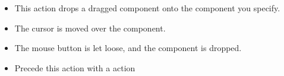 
\begin{itemize}
\item This action drops a dragged component onto the component you specify.
\item The cursor is moved over the component.
\item The mouse button is let loose, and the component is dropped. 
\item Precede this action with a  action
\end{itemize}
